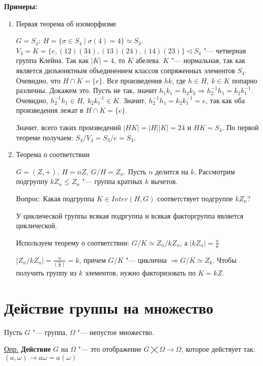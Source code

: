 \documentclass{article}
\begin{document}
\textbf{Примеры: }
\begin{enumerate}
	\item Первая теорема об изоморфизме
	
	$G = S_4; \   H = \{\sigma \in S_4 \mid \sigma(4) = 4\} \simeq S_3$.
	$V_4 = K = \{e, (1 2)(3 4), (1 3)(2 4), (1 4)(2 3)\} \triangleleft S_4$ "--- четверная группа Клейна.
	Так как $|K| = 4$, то $K$ абелева.
	$K$ "--- нормальная, так как является дизъюнктным объединением классов сопряженных элементов $S_4$.
	Очевидно, что $H \cap K = \{e\}$. Все произведения $hk$, где $h \in H, \  k \in K$ попарно различны. 
	Докажем это. Пусть не так, значит $h_1k_1 = h_2k_2 \Rightarrow h_2^{-1}h_1 = k_2k_1^{-1}$. Очевидно, $h_2^{-1}h_1 \in H, \  k_2k_1^{-1} \in K$. Значит, $h_2^{-1}h_1 = k_2k_1^{-1} = e$, так как оба произведения лежат в $H \cap K = \{e\}$.
	
	Значит, всего таких произведений $|HK| = |H||K| = 24$ и $HK = S_4$. По первой теореме получаем: $S_4/V_4  = S_3/{e} = S_3$.
	
	\item Теорема о соответствии
	
	$G = (Z, +), \  H = nZ, \  G/H = Z_n$. Пусть $n$ делится на $k$. Рассмотрим подгруппу $kZ_n \leq Z_n$ "--- группа кратных $k$ вычетов.
	
	Вопрос: Какая подгруппа $K \in Inter(H, G)$ соответствует подгруппе $kZ_n$?
	
	У циклической группы всякая подргуппа и всякая факторгруппа является циклической.
	
	Используем теорему о соответствии: $G/K \simeq Z_n/kZ_n$, а $|kZ_n| = \frac{n}{k}$
	
	$|Z_n/kZ_n| = \frac{n}{(\frac{n}{k})} = k$, причем $G/K$ "--- циклична $\Rightarrow G/K \simeq Z_k$. Чтобы получить группу из $k$ элементов, нужно факторизовать по $K = kZ$.	 
\end{enumerate}

\vspace{10pt}

\section{Действие группы на множество}

Пусть $G$ "--- группа, $\Omega$ "--- непустое множество.

\underline{Опр.} \textbf{Действие} $G$ на $\Omega$ "--- это отображение $G \bigtimes \Omega \rightarrow \Omega$, которое действует так: $(a, \omega) \rightarrow a\omega = a(\omega)$
\end{document}
